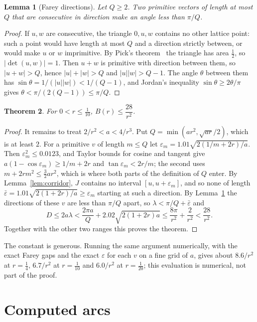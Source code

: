\documentclass[11pt]{article}
\newtheorem{theorem}{Theorem}
\newtheorem{lemma}[theorem]{Lemma}
\begin{document}
\begin{lemma}[Farey directions]\label{lem:farey}
Let $Q\ge2$. Two primitive vectors of length at most $Q$ that are consecutive in direction make an angle less than
$\pi/Q$.
\end{lemma}

\begin{proof}
If $u,w$ are consecutive, the triangle $0,u,w$ contains no other lattice point: such a point would have length at
most $Q$ and a direction strictly between, or would make $u$ or $w$ imprimitive. By Pick's theorem~\cite{BOOK} the
triangle has area $\frac12$, so $|\det(u,w)|=1$. Then $u+w$ is primitive with direction between them, so $|u+w|>Q$,
hence $|u|+|w|>Q$ and $|u||w|>Q-1$. The angle $\theta$ between them has $\sin\theta=1/(|u||w|)<1/(Q-1)$, and
Jordan's inequality $\sin\theta\ge2\theta/\pi$ gives $\theta<\pi/(2(Q-1))\le\pi/Q$.
\end{proof}

\begin{theorem}\label{thm:upper}
For $0<r\le\frac1{10}$, $B(r)\le\dfrac{28}{r^2}$.
\end{theorem}

\begin{proof}
It remains to treat $2/r^2<a<4/r^3$. Put $Q=\min(ar^2,\sqrt{ar}/2)$, which is at least $2$. For a primitive $v$ of
length $m\le Q$ let $\varepsilon_m=1.01\sqrt{2(1/m+2r)/a}$. Then $\varepsilon_m^2\le0.0123$, and Taylor bounds for
cosine and tangent give $a(1-\cos\varepsilon_m)\ge1/m+2r$ and $\tan\varepsilon_m<2r/m$; the second uses
$m+2rm^2\le\frac32ar^2$, which is where both parts of the definition of $Q$ enter. By Lemma~\ref{lem:corridor}, $J$
contains no interval $[u,u+\varepsilon_m]$, and so none of length $\bar\varepsilon=1.01\sqrt{2(1+2r)/a}\ge\varepsilon_m$
starting at such a direction. By Lemma~\ref{lem:farey} the directions of these $v$ are less than $\pi/Q$ apart, so
$\lambda<\pi/Q+\bar\varepsilon$ and
\[
D\le2a\lambda<\frac{2\pi a}Q+2.02\sqrt{2(1+2r)a}\le\frac{8\pi}{r^2}+\frac2{r^2}<\frac{28}{r^2}.
\]
Together with the other two ranges this proves the theorem.
\end{proof}

The constant is generous. Running the same argument numerically, with the exact Farey gaps and the exact $\varepsilon$
for each $v$ on a fine grid of $a$, gives about $8.6/r^2$ at $r=\frac14$, $6.7/r^2$ at $r=\frac1{10}$ and $6.0/r^2$ at
$r=\frac1{20}$; this evaluation is numerical, not part of the proof.

\section{Computed arcs}
\end{document}
